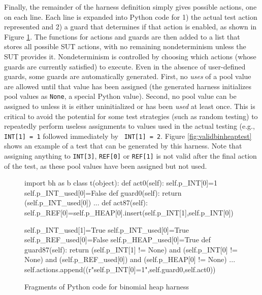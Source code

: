 \documentclass[runningheads,a4paper]{llncs}
\begin{document}
Finally, the remainder of the harness definition simply gives possible
actions, one on each line.  Each line is expanded into Python code for
1) the actual test action represented and 2) a guard that determines
if that action is enabled, as shown in Figure \ref{fig:pybinheap}.
The functions for actions and guards are then added to a list that
stores all possible SUT actions, with no remaining nondeterminism
unless the SUT provides it.  Nondeterminism is controlled by choosing
which actions (whose guards are currently satisfied) to execute.  Even in the absence of user-defined guards, some
guards are automatically generated.  First, no \emph{uses} of a pool
value are allowed until that value has been assigned (the generated
harness initializes pool values as {\tt None}, a special Python
value).  Second, no pool value can be assigned to unless it is either
uninitialized or has been \emph{used} at least once.  This is critical
to avoid the potential for some test strategies (such as random
testing) to repeatedly perform useless assignments to values used in
the actual testing (e.g., {\tt INT[1] = 1} followed immediately by {\tt
  INT[1] = 2}.  Figure \ref{fig:validbinheaptest} shows an example of
a test that can be generated by this harness.  Note that assigning
anything to {\tt INT[3]}, {\tt REF[0]} or {\tt REF[1]} is not valid
after the final action of the test, as these pool values have been
assigned but not used.

\begin{figure}[t]
{\scriptsize
\begin{code}
import bh as b
class t(object):
   def act0(self):
      self.p\_INT[0]=1
      self.p\_INT\_used[0]=False
   def guard0(self):
      return (self.p\_INT\_used[0])
...
   def act87(self):
      self.p\_REF[0]=self.p\_HEAP[0].insert(self.p\_INT[1],self.p\_INT[0])

      self.p\_INT\_used[1]=True
      self.p\_INT\_used[0]=True
      self.p\_REF\_used[0]=False
      self.p\_HEAP\_used[0]=True
   def guard87(self):
      return (self.p\_INT[1] != None) and (self.p\_INT[0] != None) and
        (self.p\_REF\_used[0]) and (self.p\_HEAP[0] != None)
...
      self.actions.append((r"self.p\_INT[0]=1",self.guard0,self.act0))

\end{code}
}
\vspace{-0.15in}
\caption{Fragments of Python code for binomial heap harness}
\vspace{-0.1in}
\label{fig:pybinheap}
\end{figure}
\end{document}
